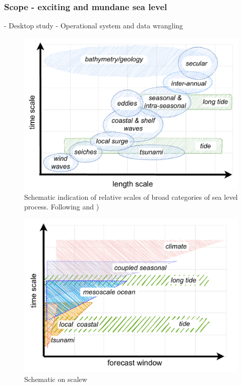 \begin{frame}
\frametitle{Scope - exciting and mundane sea level}

- Desktop study
- Operational system and data wrangling

\begin{figure}[h]\centering
  \includegraphics[width=130mm]{figures/diagrams/scales_time_length.pdf}
  \caption{Schematic indication of relative scales of broad categories of sea level process.  Following \citet{Chelton:2001ws} and \citet{10.1007/s10712-019-09531-1} )}
  \label{fig:SCALES}
\end{figure}

\begin{figure}[h]\centering
  \includegraphics{figures/diagrams/scales.pdf}
  \caption{Schematic on scalew}
  \label{fig:SCALES}
\end{figure}


\end{frame}
